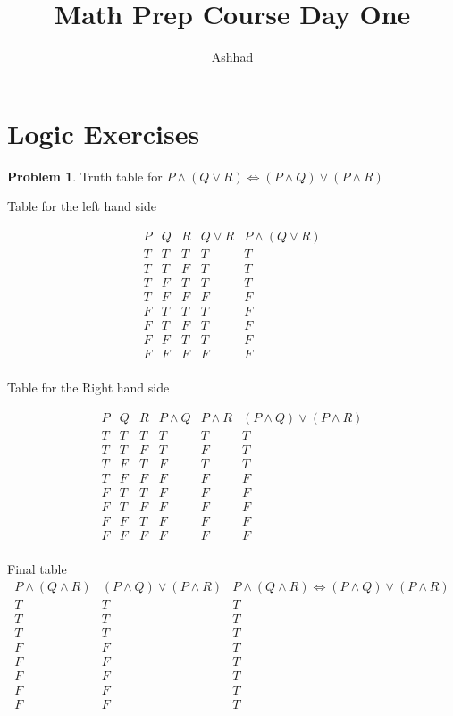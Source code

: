 \documentclass[a4paper]{article}
\title{Math Prep Course Day One}
\author{Ashhad}
\theoremstyle{definition}
\newtheorem{problem}{Problem}[section]
\begin{document}
\maketitle

\section{Logic Exercises}
\begin{problem}
Truth table for \(P \land (Q \lor R) \iff (P \land Q) \lor (P \land R)\)
\end{problem}

Table for the left hand side

\[
\begin{array}{c|c|c|c|c}
P & Q & R & Q \lor R & P \land (Q \lor R) \\
\hline
T & T & T & T & T \\
T & T & F & T & T \\
T & F & T & T & T \\
T & F & F & F & F \\
F & T & T & T & F \\
F & T & F & T & F \\
F & F & T & T & F \\
F & F & F & F & F \\
\end{array}
\]

Table for the Right hand side

\[
\begin{array}{c|c|c|c|c|c}
P & Q & R & P \land Q & P \land R  & (P \land Q) \lor (P \land R) \\
\hline
T & T & T & T & T & T \\
T & T & F & T & F & T \\
T & F & T & F & T & T \\
T & F & F & F & F & F \\
F & T & T & F & F & F \\
F & T & F & F & F & F \\
F & F & T & F & F & F \\
F & F & F & F & F & F \\
\end{array}
\]

Final table
\[
\begin{array}{c|c|c}
P \land (Q \land R) &(P \land Q) \lor (P \land R) & P \land (Q \land R) \iff (P \land Q) \lor (P \land R)\\
\hline
T & T & T \\
T & T & T \\
T & T & T \\
F & F & T \\
F & F & T \\
F & F & T \\
F & F & T \\
F & F & T \\
\end{array}
\]
\end{document}
